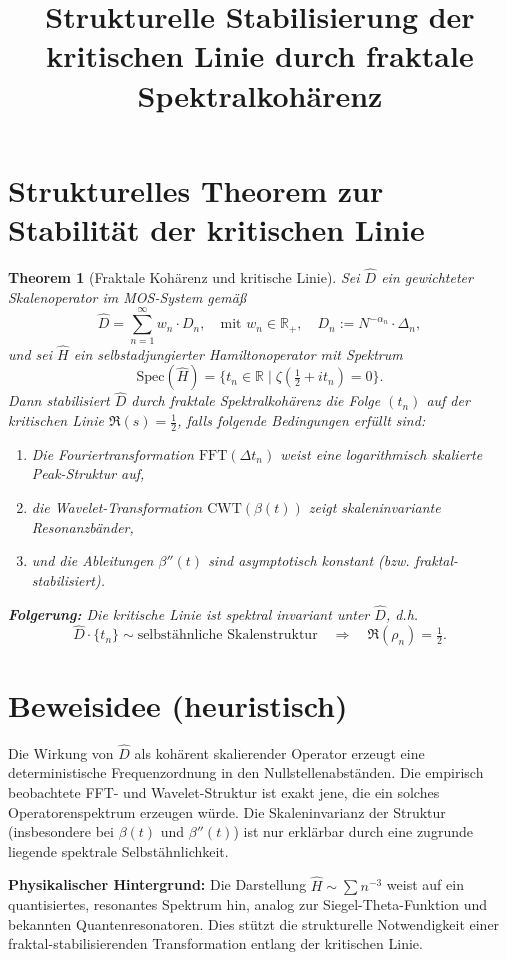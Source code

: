 \documentclass[12pt]{article}
\title{Strukturelle Stabilisierung der kritischen Linie durch fraktale Spektralkohärenz}
\author{}
\date{}
\newtheorem{theorem}{Theorem}
\begin{document}
\maketitle

\section*{Strukturelles Theorem zur Stabilität der kritischen Linie}

\begin{theorem}[Fraktale Kohärenz und kritische Linie]
Sei \(\hat{D}\) ein gewichteter Skalenoperator im MOS-System gemäß
\[
\hat{D} = \sum_{n=1}^\infty w_n \cdot D_n, \quad \text{mit } w_n \in \mathbb{R}_+, \quad D_n := N^{-\alpha_n} \cdot \Delta_n,
\]
und sei \(\hat{H}\) ein selbstadjungierter Hamiltonoperator mit Spektrum
\[
\text{Spec}(\hat{H}) = \{ t_n \in \mathbb{R} \mid \zeta(\tfrac{1}{2} + i t_n) = 0 \}.
\]
Dann stabilisiert \(\hat{D}\) durch fraktale Spektralkohärenz die Folge \((t_n)\) auf der kritischen Linie \(\Re(s) = \tfrac{1}{2}\), falls folgende Bedingungen erfüllt sind:
\begin{enumerate}
  \item Die Fouriertransformation \(\text{FFT}(\Delta t_n)\) weist eine logarithmisch skalierte Peak-Struktur auf,
  \item die Wavelet-Transformation \(\text{CWT}(\beta(t))\) zeigt skaleninvariante Resonanzbänder,
  \item und die Ableitungen \(\beta''(t)\) sind asymptotisch konstant (bzw. fraktal-stabilisiert).
\end{enumerate}
\textbf{Folgerung:}  
Die kritische Linie ist spektral invariant unter \(\hat{D}\), d.h.  
\[
\hat{D} \cdot \{t_n\} \sim \text{selbstähnliche Skalenstruktur} \quad \Rightarrow \quad \Re(\rho_n) = \tfrac{1}{2}.
\]
\end{theorem}

\section*{Beweisidee (heuristisch)}
Die Wirkung von \(\hat{D}\) als kohärent skalierender Operator erzeugt eine deterministische Frequenzordnung in den Nullstellenabständen. Die empirisch beobachtete FFT- und Wavelet-Struktur ist exakt jene, die ein solches Operatorenspektrum erzeugen würde. Die Skaleninvarianz der Struktur (insbesondere bei \(\beta(t)\) und \(\beta''(t)\)) ist nur erklärbar durch eine zugrunde liegende spektrale Selbstähnlichkeit.

\textbf{Physikalischer Hintergrund:}  
Die Darstellung \(\hat{H} \sim \sum n^{-3}\) weist auf ein quantisiertes, resonantes Spektrum hin, analog zur Siegel-Theta-Funktion und bekannten Quantenresonatoren. Dies stützt die strukturelle Notwendigkeit einer fraktal-stabilisierenden Transformation entlang der kritischen Linie.
\end{document}
